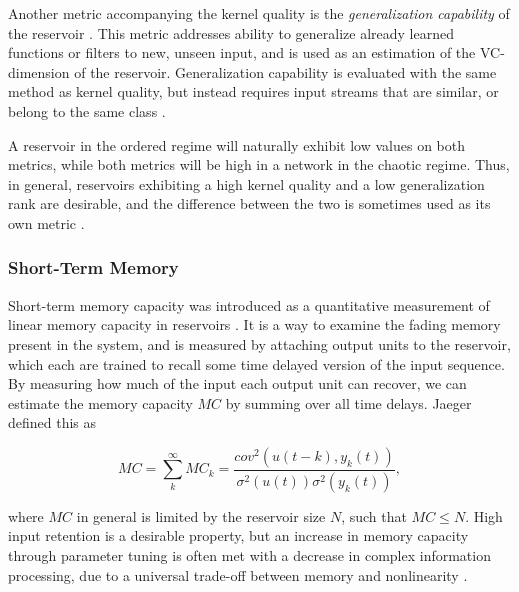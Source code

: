 Another metric accompanying the kernel quality is the \textit{generalization
capability} of the reservoir \cite{legenstein_edge_2007}. This metric addresses
ability to generalize already learned functions or filters to new, unseen input,
and is used as an estimation of the VC-dimension of the
reservoir. Generalization capability is evaluated with the same method as kernel
quality, but instead requires input streams that are similar, or belong to the
same class \cite{busing_connectivity_2010}.

A reservoir in the ordered regime will naturally exhibit low values on both
metrics, while both metrics will be high in a network in the chaotic
regime. Thus, in general, reservoirs exhibiting a high kernel quality and a low
generalization rank are desirable, and the difference between the two is
sometimes used as its own metric \cite{busing_connectivity_2010}.

\subsubsection{Short-Term Memory}

Short-term memory capacity was introduced as a quantitative measurement of
linear memory capacity in reservoirs \cite{jaeger_short_2002}. It is a way to
examine the fading memory present in the system, and is measured by attaching
output units to the reservoir, which each are trained to recall some time
delayed version of the input sequence. By measuring how much of the input each
output unit can recover, we can estimate the memory capacity $MC$ by summing
over all time delays. Jaeger defined this as

\begin{equation}
  MC =
  \sum_{k}^{\infty}MC_{k} =
  \frac
  {cov^2(u(t-k), y_k(t))}
  {\sigma^{2}(u(t))\sigma^{2}(y_{k}(t))}
  ,
  \label{stm-eq}
\end{equation}

where $MC$ in general is limited by the reservoir size $N$, such that $MC \leq
N$. High input retention is a desirable property, but an increase in memory
capacity through parameter tuning is often met with a decrease in complex
information processing, due to a universal trade-off between memory and
nonlinearity \cite{dambre_information_2012}.



